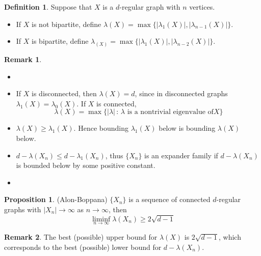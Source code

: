 \documentclass{book}
\theoremstyle{definition}
\newtheorem{proposition}[lemma]{Proposition}
\newtheorem{definition}[lemma]{Definition}
\theoremstyle{remarkstyle}
\newtheorem*{remark}{Remark}%
\begin{document}
\begin{definition}
    Suppose that $X$ is a $d$-regular graph with $n$ vertices. 
    \begin{itemize}
        \item  If $X$ is not bipartite, define $\lambda(X) = \max\{|\lambda_{1}(X)|,|\lambda_{n-1}(X)|\}  $.
        \item If $X$ is bipartite, define $\lambda_(X)= \max\{|\lambda_{1}(X)|, |\lambda_{n-2}(X)| \} $.
    \end{itemize}
\end{definition}
\begin{remark} 
    \begin{itemize}
        \item[] %
        \item If $X$ is disconnected, then $\lambda(X)=d $, since in disconnected graphs $\lambda_{1}(X)=\lambda_{0}(X)$. If $X$ is connected, $$\lambda(X) = \max\{|\lambda| \, : \, \lambda \textrm{ is a nontrivial eigenvalue of} X\} $$
        \item $\lambda(X) \ge \lambda_{1}(X) $. Hence bounding $\lambda_{1}(X)$ below is bounding $\lambda(X) $ below. 
        \item $d-\lambda(X_{n}) \le d-\lambda_{1}(X_{n}) $, thus $\{X_{n}\} $ is an expander family if $d-\lambda(X_{n})$ is bounded below by some positive constant. 
        \item[] 
    \end{itemize}
\end{remark}

\begin{proposition}
    (Alon-Boppana) \newline
    $\{X_{n}\}$ is a sequence of connected $d$-regular graphs with $|X_{n}| \rightarrow \infty $ as $n \rightarrow \infty $, then $$\liminf_{n\rightarrow \infty}\lambda(X_{n}) \ge 2\sqrt{d-1} $$
\end{proposition}
\begin{remark}
    The best (possible) upper bound for $\lambda(X)$ is $2\sqrt{d-1}$, which corresponds to the best (possible) lower bound for $d-\lambda(X_{n})$. \newline
\end{remark} 
\end{document}
